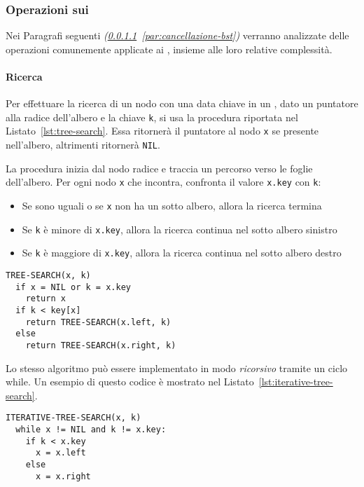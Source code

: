 \documentclass[italian, 10pt]{article}
\begin{document}
\subsubsection{Operazioni sui \BST}
\label{sec:operazioni-bst}

Nei Paragrafi seguenti \textit{(\ref{par:ricerca-bst}~\ref{par:cancellazione-bst})} verranno analizzate delle operazioni comunemente applicate ai \BST, insieme alle loro relative complessità.

\paragraph{Ricerca}
\label{par:ricerca-bst}

Per effettuare la ricerca di un nodo con una data chiave in un \BST, dato un puntatore alla radice dell'albero e la chiave \texttt{k}, si usa la procedura riportata nel Listato~\ref{lst:tree-search}.
Essa ritornerà il puntatore al nodo \texttt{x} se presente nell'albero, altrimenti ritornerà \texttt{NIL}.

La procedura inizia dal nodo radice e traccia un percorso verso le foglie dell'albero.
Per ogni nodo \texttt{x} che incontra, confronta il valore \texttt{x.key} con \texttt{k}:

\begin{itemize}
  \item Se sono uguali o se \texttt{x} non ha un sotto albero, allora la ricerca termina
  \item Se \texttt{k} è minore di \texttt{x.key}, allora la ricerca continua nel sotto albero sinistro
  \item Se \texttt{k} è maggiore di \texttt{x.key}, allora la ricerca continua nel sotto albero destro
\end{itemize}

\begin{lstlisting}[style=pseudocode, caption={Ricerca di un nodo in un \BST}, label={lst:tree-search}]
TREE-SEARCH(x, k)
  if x = NIL or k = x.key
    return x
  if k < key[x]
    return TREE-SEARCH(x.left, k)
  else
    return TREE-SEARCH(x.right, k)
\end{lstlisting}

\bigskip
Lo stesso algoritmo può essere implementato in modo \textit{ricorsivo} tramite un ciclo while.
Un esempio di questo codice è mostrato nel Listato~\ref{lst:iterative-tree-search}.

\begin{lstlisting}[style=pseudocode, caption={Ricerca iterativa di un nodo in un BST}, label={lst:iterative-tree-search}]
ITERATIVE-TREE-SEARCH(x, k)
  while x != NIL and k != x.key:
    if k < x.key
      x = x.left
    else
      x = x.right
\end{lstlisting}
\end{document}
